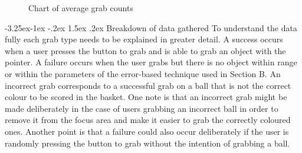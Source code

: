 \documentclass[12pt]{article}
\makeatletter
\renewcommand{\subsubsection}{\@startsection{subsubsection}{2}{\z@}%
             {-3.25ex\@plus -1ex \@minus -.2ex}%
             {1.5ex \@plus .2ex}%
             {\normalfont\normalsize\scshape\bfseries}}
\makeatother
\begin{document}
\begin{figure}
\centering 
\hspace{-1cm}
\caption{Chart of average grab counts}
\end{figure}


\subsubsection{Breakdown of data gathered}
To understand the data fully each grab type needs to be explained in greater detail. A success occurs when a user presses the button to grab and is able to grab an object with the pointer. A failure occurs when the user grabs but there is no object within range or within the parameters of the error-based technique used in Section B. An incorrect grab corresponds to a successful grab on a ball that is not the correct colour to be scored in the basket. One note is that an incorrect grab might be made deliberately in the case of users grabbing an incorrect ball in order to remove it from the focus area and make it easier to grab the correctly coloured ones. Another point is that a failure could also occur deliberately if the user is randomly pressing the button to grab without the intention of grabbing a ball.
\end{document}
